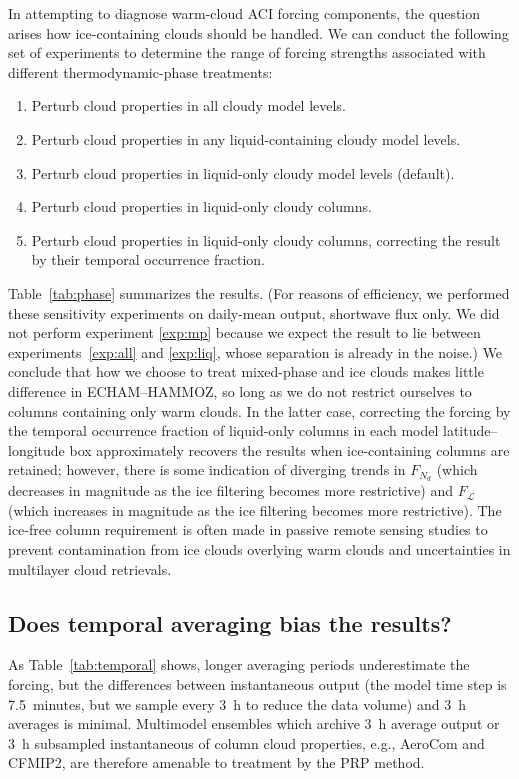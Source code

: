 \documentclass[acp, manuscript]{copernicus}\usepackage[]{graphicx}\usepackage[]{color}
\newcommand\nd{\ensuremath{N_d}}
\newcommand\lwp{\ensuremath{\mathcal L}}
\begin{document}
In attempting to diagnose warm-cloud ACI forcing components, the question arises
how ice-containing clouds should be handled.  We can conduct the following set
of experiments to determine the range of forcing strengths associated with
different thermodynamic-phase treatments:
\begin{enumerate}
\item Perturb cloud properties in all cloudy model levels.\label{exp:all}
\item Perturb cloud properties in any liquid-containing cloudy model levels.\label{exp:mp}
\item Perturb cloud properties in liquid-only cloudy model levels (default).\label{exp:liq}
\item Perturb cloud properties in liquid-only cloudy columns.
\item Perturb cloud properties in liquid-only cloudy columns, correcting the
  result by their temporal occurrence fraction.
\end{enumerate}


Table~\ref{tab:phase} summarizes the results.  (For reasons of efficiency, we
performed these sensitivity experiments on daily-mean output, shortwave flux only.  We
did not perform experiment \ref{exp:mp} because we expect the result to lie
between experiments~\ref{exp:all} and \ref{exp:liq}, whose separation is already
in the noise.)  We conclude that how we choose to treat mixed-phase and ice
clouds makes little difference in ECHAM--HAMMOZ, so long as we do not restrict
ourselves to columns containing only warm clouds.  In the latter case,
correcting the forcing by the temporal occurrence fraction of liquid-only
columns in each model latitude--longitude box approximately recovers the results
when ice-containing columns are retained; however, there is some indication
of diverging trends in $F_{\nd}$ (which decreases in magnitude as the ice filtering becomes
more restrictive) and $F_{\lwp}$ (which increases in magnitude as the ice filtering becomes
more restrictive).  The ice-free column requirement is often made in
passive remote sensing studies to prevent contamination from ice clouds
overlying warm clouds and uncertainties in multilayer cloud retrievals.

\subsection{Does temporal averaging bias the results?}
\label{sec:temporal}

As Table~\ref{tab:temporal} shows, longer averaging periods underestimate the
forcing, but the differences between instantaneous output (the model time step
is 7.5~\unit{minutes}, but we sample every 3~\unit{h} to reduce the data volume)
and 3~\unit{h} averages is minimal.  Multimodel ensembles which archive
3~\unit{h} average output or 3~\unit{h} subsampled instantaneous of column cloud
properties, e.g., AeroCom and CFMIP2, are therefore amenable to treatment by the
PRP method.
\end{document}

